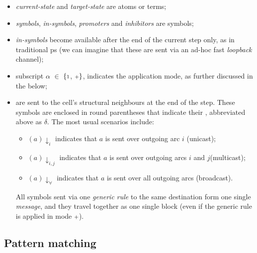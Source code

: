 \begin{itemize}
\item \emph{current-state} and \emph{target-state} are atoms or terms;

\smallskip
\item \emph{symbols}, \emph{in-symbols}, \emph{promoters} and \emph{inhibitors} are symbols;

\smallskip
\item \emph{in-symbols} become available after the end of the current step only, as in traditional \gls{ps}  (we can imagine that these are sent via an ad-hoc fast \emph{loopback} channel); 

\smallskip
\item subscript \(\alpha\) \(\in\) \(\{{\scriptstyle 1}\), \({\scriptstyle +}\}\), 
indicates the application mode, as further discussed in the below;

\smallskip
\item {} are sent to the cell's structural neighbours at the end of the step.
These symbols are enclosed in round parentheses that indicate 
their , abbreviated above as \(\delta\). 
The most usual scenarios include: 

\begin{itemize}
\item \((a)\downarrow_i\) indicates that \(a\) is sent over outgoing arc \(i\) (unicast); 

\item \((a)\downarrow_{i,j}\) indicates that \(a\) is sent over outgoing arcs \(i\) and \(j\)(multicast); 

\item \((a)\downarrow_\forall\) indicates that \(a\) is sent over all outgoing arcs (broadcast). 
\end{itemize}

All symbols sent via one \emph{generic rule} to the same destination form one single \emph{message}, and they travel together as one single block (even if the generic rule is applied in mode \({\scriptstyle +}\)).
\end{itemize}

\subsection{Pattern matching}

